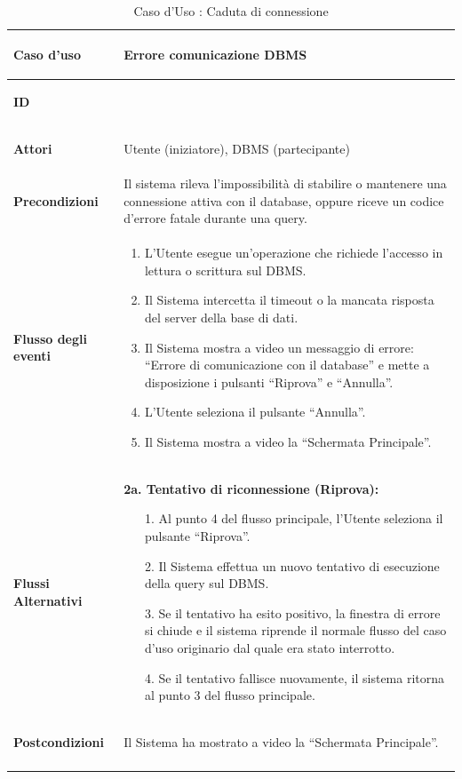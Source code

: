 \documentclass[12pt,a4paper]{article}
\begin{document}
\small
\begin{longtable}{|
>{\columncolor{unipablue}\color{white}\bfseries\raggedright\arraybackslash}p{3.4cm}|
>{\raggedright\arraybackslash}p{11.1cm}|}
\hline
\textbf{Caso d’uso} & Errore comunicazione DBMS \\ \hline
\textbf{ID} & 0.1 \\ \hline
\textbf{Attori} & Utente (iniziatore), DBMS (partecipante) \\ \hline
\textbf{Precondizioni} & Il sistema rileva l'impossibilità di stabilire o mantenere una connessione attiva con il database, oppure riceve un codice d'errore fatale durante una query. \\ \hline
\textbf{Flusso degli eventi} &
\begin{enumerate}
    \item L'Utente esegue un'operazione che richiede l'accesso in lettura o scrittura sul DBMS.
    \item Il Sistema intercetta il timeout o la mancata risposta del server della base di dati.
    \item Il Sistema mostra a video un messaggio di errore: ``Errore di comunicazione con il database'' e mette a disposizione i pulsanti ``Riprova'' e ``Annulla''.
    \item L'Utente seleziona il pulsante ``Annulla''.
    \item Il Sistema mostra a video la ``Schermata Principale''.
\end{enumerate} \\ \hline
\textbf{Flussi Alternativi} &
\textbf{2a. Tentativo di riconnessione (Riprova):}
\begin{itemize}
    \item[1.] Al punto 4 del flusso principale, l'Utente seleziona il pulsante ``Riprova''.
    \item[2.] Il Sistema effettua un nuovo tentativo di esecuzione della query sul DBMS.
    \item[3.] Se il tentativo ha esito positivo, la finestra di errore si chiude e il sistema riprende il normale flusso del caso d'uso originario dal quale era stato interrotto.
    \item[4.] Se il tentativo fallisce nuovamente, il sistema ritorna al punto 3 del flusso principale.
\end{itemize} \\ \hline
\textbf{Postcondizioni} & Il Sistema ha mostrato a video la ``Schermata Principale''. \\ \hline
\caption{Caso d'Uso : Caduta di connessione}
\label{tab:uc_errore_dbms}\\
\end{longtable}
\normalsize
\end{document}
